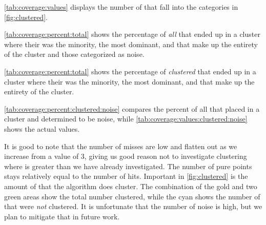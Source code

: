 \autoref{tab:coverage:values} displays the number of \isols{} that fall into the categories in \autoref{fig:clustered}.

\autoref{tab:coverage:percent:total} shows the percentage of \textit{all} \isols{} that ended up in a cluster where their \spec{} was the minority, the most dominant, and that make up the entirety of the cluster and those categorized as noise.

\autoref{tab:coverage:percent:total} shows the percentage of \textit{clustered} \isols{} that ended up in a cluster where their \spec{} was the minority, the most dominant, and that make up the entirety of the cluster.

\autoref{tab:coverage:percent:clustered:noise} compares the percent of all \isols{} that \dbscan{} placed in a cluster and determined to be noise, while \autoref{tab:coverage:values:clustered:noise} shows the actual values.



It is good to note that the number of misses are low and flatten out as we increase \minneigh{} from a value of 3, giving us good reason not to investigate clustering where \minneigh{} is greater than we have already investigated.
The number of pure points stays relatively equal to the number of hits.
Important in \autoref{fig:clustered} is the amount of \isols{} that the algorithm does cluster.
The combination of the gold and two green areas show the total number clustered, while the cyan shows the number of \isols{} that were \textit{not} clustered.
It is unfortunate that the number of noise \isols{} is high, but we plan to mitigate that in future work.

